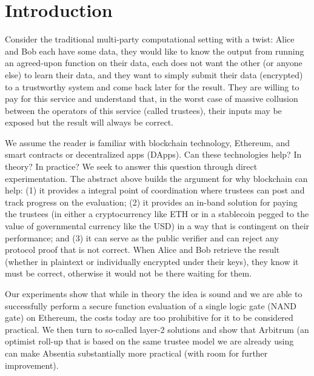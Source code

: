 


\section{Introduction}

Consider the traditional multi-party computational setting with a twist: Alice and Bob each have some data, they would like to know the output from running an agreed-upon function on their data, each does not want the other (or anyone else) to learn their data, and they want to simply submit their data (\eg encrypted) to a trustworthy system and come back later for the result. They are willing to pay for this service and understand that, in the worst case of massive collusion between the operators of this service (called trustees), their inputs may be exposed but the result will always be correct.

We assume the reader is familiar with blockchain technology, Ethereum, and smart contracts or decentralized apps (DApps). Can these technologies help? In theory? In practice? We seek to answer this question through direct experimentation. The abstract above builds the argument for why blockchain can help: (1) it provides a integral point of coordination where trustees can post and track progress on the evaluation; (2) it provides an in-band solution for paying the trustees (in either a cryptocurrency like ETH or in a stablecoin pegged to the value of governmental currency like the USD) in a way that is contingent on their performance; and (3) it can serve as the public verifier and can reject any protocol proof that is not correct. When Alice and Bob retrieve the result (whether in plaintext or individually encrypted under their keys), they know it must be correct, otherwise it would not be there waiting for them.

Our experiments show that while in theory the idea is sound and we are able to successfully perform a secure function evaluation of a single logic gate (NAND gate) on Ethereum, the costs today are too prohibitive for it to be considered practical. We then turn to so-called layer-2 solutions and show that Arbitrum (an optimist roll-up that is based on the same trustee model we are already using~\cite{KGCWF18} can make Absentia substantially more practical (with room for further improvement).
 
